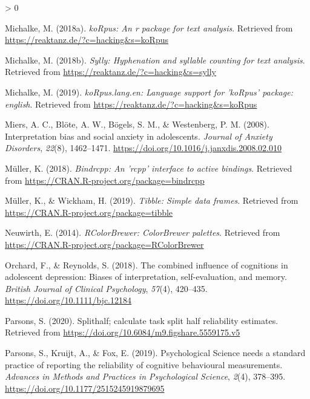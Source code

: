 \documentclass[
  english,
  man]{apa6}
\newlength{\cslhangindent}
\newenvironment{CSLReferences}[2] %
 {%
  \setlength{\parindent}{0pt}
  \ifodd #1 \everypar{\setlength{\hangindent}{\cslhangindent}}\ignorespaces\fi
  \ifnum #2 > 0
  \setlength{\parskip}{#2\baselineskip}
  \fi
 }%
 {}
\begin{document}
\begin{CSLReferences}{1}{0}
\leavevmode\hypertarget{ref-R-koRpus}{}%
Michalke, M. (2018a). \emph{koRpus: An r package for text analysis}. Retrieved from \url{https://reaktanz.de/?c=hacking\&s=koRpus}

\leavevmode\hypertarget{ref-R-sylly}{}%
Michalke, M. (2018b). \emph{Sylly: Hyphenation and syllable counting for text analysis}. Retrieved from \url{https://reaktanz.de/?c=hacking\&s=sylly}

\leavevmode\hypertarget{ref-R-koRpus.lang.en}{}%
Michalke, M. (2019). \emph{koRpus.lang.en: Language support for 'koRpus' package: english}. Retrieved from \url{https://reaktanz.de/?c=hacking\&s=koRpus}

\leavevmode\hypertarget{ref-miers_interpretation_2008}{}%
Miers, A. C., Blöte, A. W., Bögels, S. M., \& Westenberg, P. M. (2008). Interpretation bias and social anxiety in adolescents. \emph{Journal of Anxiety Disorders}, \emph{22}(8), 1462--1471. \url{https://doi.org/10.1016/j.janxdis.2008.02.010}

\leavevmode\hypertarget{ref-R-bindrcpp}{}%
Müller, K. (2018). \emph{Bindrcpp: An 'rcpp' interface to active bindings}. Retrieved from \url{https://CRAN.R-project.org/package=bindrcpp}

\leavevmode\hypertarget{ref-R-tibble}{}%
Müller, K., \& Wickham, H. (2019). \emph{Tibble: Simple data frames}. Retrieved from \url{https://CRAN.R-project.org/package=tibble}

\leavevmode\hypertarget{ref-R-RColorBrewer}{}%
Neuwirth, E. (2014). \emph{RColorBrewer: ColorBrewer palettes}. Retrieved from \url{https://CRAN.R-project.org/package=RColorBrewer}

\leavevmode\hypertarget{ref-orchard_combined_2018}{}%
Orchard, F., \& Reynolds, S. (2018). The combined influence of cognitions in adolescent depression: {Biases} of interpretation, self-evaluation, and memory. \emph{British Journal of Clinical Psychology}, \emph{57}(4), 420--435. \url{https://doi.org/10.1111/bjc.12184}

\leavevmode\hypertarget{ref-R-splithalf}{}%
Parsons, S. (2020). Splithalf; calculate task split half reliability estimates. Retrieved from \url{https://doi.org/10.6084/m9.figshare.5559175.v5}

\leavevmode\hypertarget{ref-Parsons2019}{}%
Parsons, S., Kruijt, A., \& Fox, E. (2019). Psychological {Science} needs a standard practice of reporting the reliability of cognitive behavioural measurements. \emph{Advances in Methods and Practices in Psychological Science}, \emph{2}(4), 378--395. \url{https://doi.org/10.1177/2515245919879695}


\end{CSLReferences}
\end{document}
